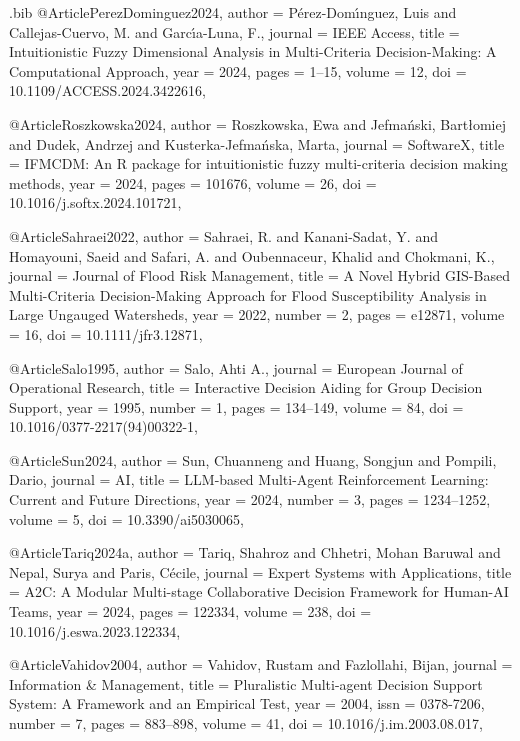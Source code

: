 \begin{filecontents*}[overwrite]{\jobname.bib}
@Article{PerezDominguez2024,
  author  = {P{\'e}rez-Dom{\'\i}nguez, Luis and Callejas-Cuervo, M. and Garc{\'\i}a-Luna, F.},
  journal = {IEEE Access},
  title   = {Intuitionistic Fuzzy Dimensional Analysis in Multi-Criteria Decision-Making: A Computational Approach},
  year    = {2024},
  pages   = {1--15},
  volume  = {12},
  doi     = {10.1109/ACCESS.2024.3422616},
}

@Article{Roszkowska2024,
  author  = {Roszkowska, Ewa and Jefma{\'n}ski, Bart{\l}omiej and Dudek, Andrzej and Kusterka-Jefma{\'n}ska, Marta},
  journal = {SoftwareX},
  title   = {{IFMCDM}: An {R} package for intuitionistic fuzzy multi-criteria decision making methods},
  year    = {2024},
  pages   = {101676},
  volume  = {26},
  doi     = {10.1016/j.softx.2024.101721},
}

@Article{Sahraei2022,
  author  = {Sahraei, R. and Kanani-Sadat, Y. and Homayouni, Saeid and Safari, A. and Oubennaceur, Khalid and Chokmani, K.},
  journal = {Journal of Flood Risk Management},
  title   = {A Novel Hybrid {GIS}-Based Multi-Criteria Decision-Making Approach for Flood Susceptibility Analysis in Large Ungauged Watersheds},
  year    = {2022},
  number  = {2},
  pages   = {e12871},
  volume  = {16},
  doi     = {10.1111/jfr3.12871},
}

@Article{Salo1995,
  author  = {Salo, Ahti A.},
  journal = {European Journal of Operational Research},
  title   = {Interactive Decision Aiding for Group Decision Support},
  year    = {1995},
  number  = {1},
  pages   = {134--149},
  volume  = {84},
  doi     = {10.1016/0377-2217(94)00322-1},
}

@Article{Sun2024,
  author  = {Sun, Chuanneng and Huang, Songjun and Pompili, Dario},
  journal = {AI},
  title   = {{LLM}-based Multi-Agent Reinforcement Learning: Current and Future Directions},
  year    = {2024},
  number  = {3},
  pages   = {1234--1252},
  volume  = {5},
  doi     = {10.3390/ai5030065},
}

@Article{Tariq2024a,
  author  = {Tariq, Shahroz and Chhetri, Mohan Baruwal and Nepal, Surya and Paris, C{\'e}cile},
  journal = {Expert Systems with Applications},
  title   = {{A2C}: A Modular Multi-stage Collaborative Decision Framework for Human-{AI} Teams},
  year    = {2024},
  pages   = {122334},
  volume  = {238},
  doi     = {10.1016/j.eswa.2023.122334},
}

@Article{Vahidov2004,
  author  = {Vahidov, Rustam and Fazlollahi, Bijan},
  journal = {Information \& Management},
  title   = {Pluralistic Multi-agent Decision Support System: A Framework and an Empirical Test},
  year    = {2004},
  issn    = {0378-7206},
  number  = {7},
  pages   = {883--898},
  volume  = {41},
  doi     = {10.1016/j.im.2003.08.017},
}


\end{filecontents*}
